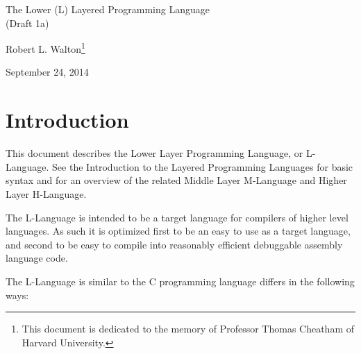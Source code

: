 \documentclass[12pt]{article}
\makeatletter
\renewcommand\tableofcontents{%
    \begin{list}{}%
	     {\setlength{\itemsep}{0in}%
	      \setlength{\topsep}{0in}%
	      \setlength{\parsep}{1ex}%
	      \setlength{\labelwidth}{0in}%
	      \setlength{\baselineskip}{1.5ex}%
	      \setlength{\leftmargin}{1.0in}%
	      \setlength{\rightmargin}{1.0in}}%
    \item\@starttoc{toc}%
    \end{list}}
\makeatother
\begin{document}
        
\begin{center}

{\Large
The Lower (L) Layered Programming Language \\[0.5ex]
(Draft 1a)}

\medskip

Robert L. Walton\footnote{This document is dedicated to the memory
of Professor Thomas Cheatham of Harvard University.}

September 24, 2014
 
\end{center}

{\small \tableofcontents}

\newpage

\section{Introduction}

This document describes the Lower Layer Programming Language, or
L-Language.  See the Introduction to the Layered
Programming Languages for basic syntax and for an overview of the related
Middle Layer M-Language and Higher Layer H-Language.

The L-Language is intended to be a target language for compilers of
higher level languages.  As such it is optimized first to be an easy to 
use as a target language, and second to be easy to
compile into reasonably efficient debuggable assembly language code.

The L-Language is similar to the C programming language
differs in the following ways:
\end{document}
